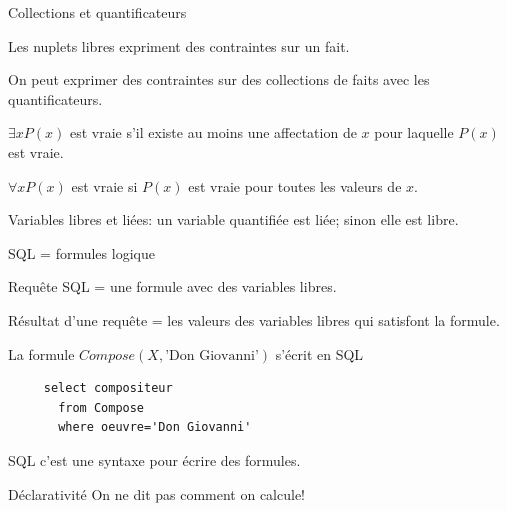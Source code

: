 \begin{frame}{Collections et quantificateurs}

Les nuplets libres expriment des contraintes sur un fait. 

\vfill


On peut exprimer des contraintes sur des collections de faits avec les quantificateurs.


\begin{redbullet}
   \item $\exists x P(x)$ est vraie s'il existe \alert{au moins} une affectation de $x$
     pour laquelle $P(x)$ est 
     vraie.
   \item $\forall x P(x)$ est vraie si $P(x)$ est 
     vraie pour \alert{toutes} les valeurs de $x$.
\end{redbullet}

\vfill

\begin{blocgauche}
\alert{Variables libres et liées}: un variable quantifiée est liée; sinon elle est libre.
\end{blocgauche}

\end{frame}


\begin{frame}[fragile]{SQL = formules logique}

\alert{Requête SQL } = une formule avec des variables libres.

\vfill

\alert{Résultat d'une requête} = les valeurs des variables libres qui satisfont la formule.

\vfill
 La formule $Compose  (X, \text{'Don Giovanni'})$ s'écrit en SQL

\begin{verbatim}
     select compositeur
       from Compose
       where oeuvre='Don Giovanni'
\end{verbatim}

SQL c'est une syntaxe pour écrire des formules.
\vfill


\begin{blocgauche}
\begin{remblock}{Déclarativité}
On ne dit pas comment on calcule!
\end{remblock}
\end{blocgauche}

\end{frame}


